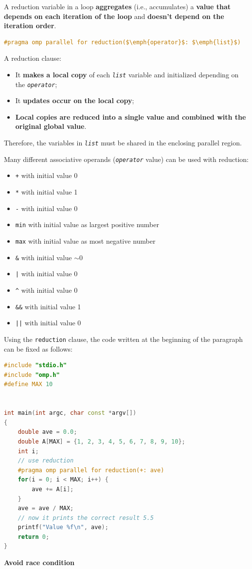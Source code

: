 \highspace
A reduction variable in a loop \textbf{aggregates} (i.e., accumulates) a \textbf{value that depends on each iteration of the loop} and \textbf{doesn't depend on the iteration order}.

\begin{openmpbox}
    \begin{lstlisting}[language=C++, mathescape=true]
#pragma omp parallel for reduction($\emph{operator}$: $\emph{list}$)\end{lstlisting}
\end{openmpbox}

\noindent
A reduction clause:
\begin{itemize}
    \item It \textbf{makes a local copy} of each \texttt{\emph{list}} variable and initialized depending on the \texttt{\emph{operator}};
    \item It \textbf{updates occur on the local copy};
    \item \textbf{Local copies are reduced into a single value and combined with the original global value}.
\end{itemize}
Therefore, the variables in \texttt{\emph{list}} must be shared in the enclosing parallel region.

\highspace
Many different associative operands (\texttt{\emph{operator}} value) can be used with reduction:
\begin{itemize}
    \item \texttt{+} with initial value 0
    \item \texttt{*} with initial value 1
    \item \texttt{-} with initial value 0
    \item \texttt{min} with initial value as largest positive number
    \item \texttt{max} with initial value as most negative number
    \item \texttt{\&} with initial value $\sim0$
    \item \texttt{|} with initial value 0
    \item \texttt{\textasciicircum} with initial value 0
    \item \texttt{\&\&} with initial value 1
    \item \texttt{||} with initial value 0
\end{itemize}
Using the \texttt{reduction} clause, the code written at the beginning of the paragraph can be fixed as follows:
\begin{center}
\begin{lstlisting}[language=C++]
#include "stdio.h"
#include "omp.h"
#define MAX 10


int main(int argc, char const *argv[])
{
    double ave = 0.0;
    double A[MAX] = {1, 2, 3, 4, 5, 6, 7, 8, 9, 10};
    int i;
    // use reduction
    #pragma omp parallel for reduction(+: ave)
    for(i = 0; i < MAX; i++) {
        ave += A[i];
    }
    ave = ave / MAX;
    // now it prints the correct result 5.5
    printf("Value %f\n", ave);
    return 0;
}
\end{lstlisting}
\textcolor{Green3}{ \textbf{Avoid race condition}}
\end{center}

